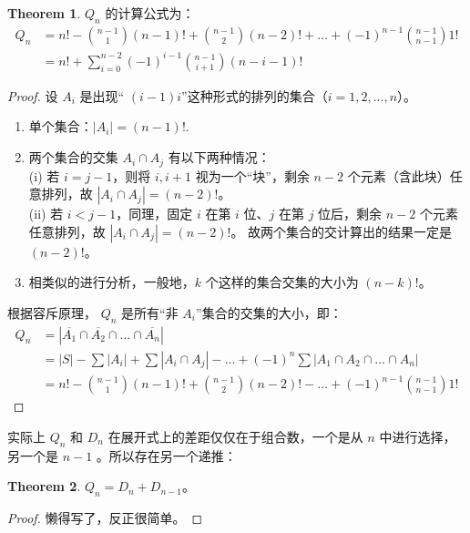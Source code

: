 \documentclass[oneside]{book}
\theoremstyle{definition}
\newtheorem{theorem}{Theorem}[section]
\begin{document}
	\begin{theorem}
		\(Q_n\) 的计算公式为：
		\[
		\begin{aligned}
			Q_n &= n! - \binom{n-1}{1}(n-1)! + \binom{n-1}{2}(n-2)! + \dots + (-1)^{n-1}\binom{n-1}{n-1}1! \\
			&= n! + \sum_{i=0}^{n-2} (-1)^{i-1} \binom{n-1}{i+1} (n-i-1)!
		\end{aligned}
		\]
	\end{theorem}
	
	\begin{proof}
		设 \(A_i\) 是出现“ \( (i-1)i\)”这种形式的排列的集合（\(i = 1,2,\dots,n\)）。
		\begin{enumerate}
			\item 单个集合：\(|A_i| = (n-1)!\).
			\item 两个集合的交集 \(A_i \cap A_j\) 有以下两种情况：\\
			(i) 若 \(i = j-1\)，则将 \(i, i+1\) 视为一个“块”，剩余 \(n-2\) 个元素（含此块）任意排列，故 \(|A_i \cap A_j| = (n-2)!\)。\\
			(ii) 若 \(i < j-1\)，同理，固定 \(i\) 在第 \(i\) 位、\(j\) 在第 \(j\) 位后，剩余 \(n-2\) 个元素任意排列，故 \(|A_i \cap A_j| = (n-2)!\)。
			故两个集合的交计算出的结果一定是\((n-2)!\)。
			\item 相类似的进行分析，一般地，\(k\) 个这样的集合交集的大小为 \((n-k)!\)。
		\end{enumerate}
		
		根据容斥原理， \(Q_n\) 是所有“非 \(A_i\)”集合的交集的大小，即：
		\[
		\begin{aligned}
			Q_n &= \left| \overline{A_1} \cap \overline{A_2} \cap \dots \cap \overline{A_n} \right| \\
			&= |S| - \sum|A_i| + \sum|A_i \cap A_j| - \dots + (-1)^n \sum|A_1 \cap A_2 \cap \dots \cap A_n| \\
			&= n! - \binom{n-1}{1}(n-1)! + \binom{n-1}{2}(n-2)! - \dots + (-1)^{n-1}\binom{n-1}{n-1}1!
		\end{aligned}
		\]
	\end{proof}
	
	实际上 \(Q_n\) 和 \(D_n\) 在展开式上的差距仅仅在于组合数，一个是从 \( n \) 中进行选择，另一个是 \(n-1\) 。所以存在另一个递推：
	\begin{theorem}
		\(Q_n=D_n+D_{n-1}\)。
	\end{theorem}
	
	\begin{proof}
		懒得写了，反正很简单。
	\end{proof}
	
\end{document}
